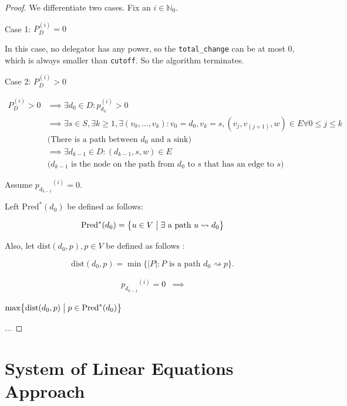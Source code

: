 \begin{proof} We differentiate two cases. Fix an $i \in \mathbb{N}_0$.

Case 1: $P_D^{(i)} = 0$

In this case, no delegator has any power, so the \texttt{total\_change} can be at most 0, which is always smaller than \texttt{cutoff}. So the algorithm terminates.

Case 2: $P_D^{(i)} > 0$

\begin{align*}
P_D^{(i)} > 0 
& \implies \exists d_0 \in D: p_{d_0}^{(i)} > 0 \\ 
& \implies \exists s \in S, \exists k \ge 1, \exists (v_0, ..., v_k): v_0 = d_0, v_k= s, (v_j, v_{(j+1)}, w) \in E \forall 0 \le j \le k \\
&\text{(There is a path between $d_0$ and a sink)} \\
& \implies \exists d_{k-1} \in D: (d_{k-1}, s, w) \in E \\
& \text{($d_{k-1}$ is the node on the path from $d_0$ to $s$ that has an edge to $s$)}
\end{align*}

Assume ${p_{d_{k-1}}}^{(i)} = 0$.

Left $\mathrm{Pred}^*(d_0)$ be defined as follows:

\[
\mathrm{Pred}^*(d_{0})=\bigl\{u \in V \bigm| \exists\text{ a path }u \rightsquigarrow d_{0} \bigr\}
\]

Also, let $\mathrm{dist}(d_{0}, p), p \in V$  be defined as follows :

\[
\mathrm{dist}(d_{0},p) =\min\bigl\{|P| : P\text{ is a path }d_{0}\rightsquigarrow p\bigr\}.
\]

\begin{align*}
{p_{d_{k-1}}}^{(i)} = 0 &\implies 
\end{align*}

$\max\bigl\{\mathrm{dist}(d_0,p)\bigm|p\in \mathrm{Pred}^*(d_0)\bigr\} $

...




\end{proof}

\section{System of Linear Equations Approach}

